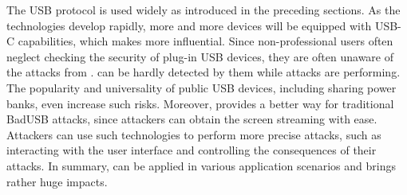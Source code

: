 The \ac{USB} protocol is used widely as introduced in the preceding sections.  As the
technologies develop rapidly, more and more devices will be equipped with USB-C
capabilities, which makes \tool more influential.  
Since non-professional users often neglect checking the security of plug-in \ac{USB} devices, they are often unaware of the attacks from \tool.
can be hardly detected by them while attacks are performing.  
The popularity and universality of public \ac{USB} devices, including sharing power banks, even
increase such risks.  Moreover, \tool provides a better way for traditional
BadUSB attacks, since attackers can obtain the screen streaming with ease.
Attackers can use such technologies to perform more precise attacks, such as
interacting with the user interface and controlling the consequences of their
attacks.  In summary, \tool can be applied in various application scenarios and
brings rather huge impacts.
